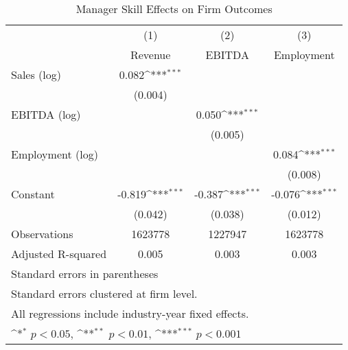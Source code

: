 \begin{table}[htbp]\centering
\def\sym#1{\ifmmode^{#1}\else\(^{#1}\)\fi}
\caption{Manager Skill Effects on Firm Outcomes}
\begin{tabular}{l*{3}{c}}
\toprule
                    &\multicolumn{1}{c}{(1)}&\multicolumn{1}{c}{(2)}&\multicolumn{1}{c}{(3)}\\
                    &\multicolumn{1}{c}{Revenue}&\multicolumn{1}{c}{EBITDA}&\multicolumn{1}{c}{Employment}\\
\midrule
Sales (log)         &       0.082\sym{***}&                     &                     \\
                    &     (0.004)         &                     &                     \\
\addlinespace
EBITDA (log)        &                     &       0.050\sym{***}&                     \\
                    &                     &     (0.005)         &                     \\
\addlinespace
Employment (log)    &                     &                     &       0.084\sym{***}\\
                    &                     &                     &     (0.008)         \\
\addlinespace
Constant            &      -0.819\sym{***}&      -0.387\sym{***}&      -0.076\sym{***}\\
                    &     (0.042)         &     (0.038)         &     (0.012)         \\
\midrule
Observations        &     1623778         &     1227947         &     1623778         \\
Adjusted R-squared  &       0.005         &       0.003         &       0.003         \\
\bottomrule
\multicolumn{4}{l}{\footnotesize Standard errors in parentheses}\\
\multicolumn{4}{l}{\footnotesize Standard errors clustered at firm level.}\\
\multicolumn{4}{l}{\footnotesize All regressions include industry-year fixed effects.}\\
\multicolumn{4}{l}{\footnotesize \sym{*} \(p<0.05\), \sym{**} \(p<0.01\), \sym{***} \(p<0.001\)}\\
\end{tabular}
\end{table}

